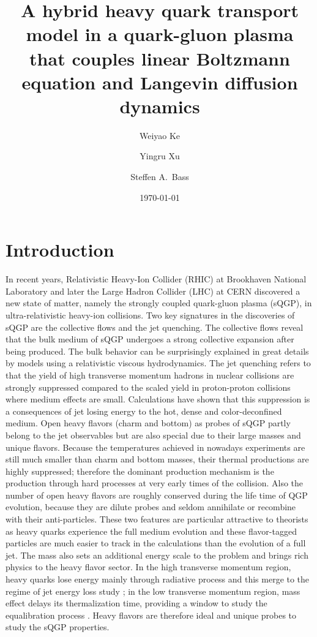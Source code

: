 \documentclass[aps, prc, reprint, amsmath, groupedaddress, nofootinbib]{revtex4-1}
\begin{document}
\title{A hybrid heavy quark transport model in a quark-gluon plasma that couples linear Boltzmann equation and Langevin diffusion dynamics}
\author{Weiyao Ke}
\author{Yingru Xu}
\author{Steffen A.\ Bass}
\date{\today}
\maketitle

\section{Introduction}
In recent years, Relativistic Heavy-Ion Collider (RHIC) at Brookhaven National Laboratory and later the Large Hadron Collider (LHC) at CERN discovered a new state of matter, namely the strongly coupled quark-gluon plasma (sQGP), in ultra-relativistic heavy-ion collisions.
Two key signatures in the discoveries of sQGP are the collective flows and the jet quenching.
The collective flows reveal that the bulk medium of sQGP undergoes a strong collective expansion after being produced.
The bulk behavior can be surprisingly explained in great details by models using a relativistic viscous hydrodynamics.
The jet quenching refers to that the yield of high transverse momentum hadrons in nuclear collisions are strongly suppressed compared to the scaled yield in proton-proton collisions where medium effects are small.
Calculations have shown that this suppression is a consequences of jet losing energy to the hot, dense and color-deconfined medium. 
Open heavy flavors (charm and bottom) as probes of sQGP partly belong to the jet observables but are also special due to their large masses and unique flavors.
Because the temperatures achieved in nowadays experiments are still much smaller than charm and bottom masses, their thermal productions are highly suppressed; 
therefore the dominant production mechanism is the production through hard processes at very early times of the collision.
Also the number of open heavy flavors are roughly conserved during the life time of QGP evolution, because they are dilute probes and seldom annihilate or recombine with their anti-particles.
These two features are particular attractive to theorists as heavy quarks experience the full medium evolution and these flavor-tagged particles are much easier to track in the calculations than the evolution of a full jet.
The mass also sets an additional energy scale to the problem and brings rich physics to the heavy flavor sector.
In the high transverse momentum region, heavy quarks lose energy mainly through radiative process and this merge to the regime of jet energy loss study \cite{Wicks:2007am, Djordjevic:2004nq, Xu:2014tda, Kang:2016ofv};
in the low transverse momentum region, mass effect delays its thermalization time, providing a window to study the equalibration process \cite{Moore:2004tg,Riek:2010fk}.
Heavy flavors are therefore ideal and unique probes to study the sQGP properties.
\end{document}
